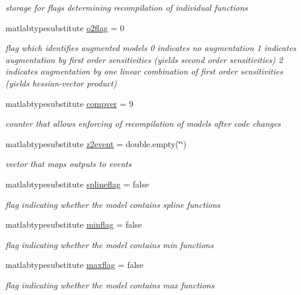 \begin{DoxyCompactItemize}
\begin{DoxyCompactList}\small\item\em storage for flags determining recompilation of individual functions \end{DoxyCompactList}\item 
matlabtypesubstitute \hyperlink{classamimodel_a2b89e3b4e249878a2d436ee337952c4f}{o2flag} = 0
\begin{DoxyCompactList}\small\item\em flag which identifies augmented models 0 indicates no augmentation 1 indicates augmentation by first order sensitivities (yields second order sensitivities) 2 indicates augmentation by one linear combination of first order sensitivities (yields hessian-\/vector product) \end{DoxyCompactList}\item 
matlabtypesubstitute \hyperlink{classamimodel_a0a9e4caf628a02e6db68e91c2de6f382}{compver} = 9
\begin{DoxyCompactList}\small\item\em counter that allows enforcing of recompilation of models after code changes \end{DoxyCompactList}\item 
matlabtypesubstitute \hyperlink{classamimodel_a7a7be015feeb7a346dceccd49e622b4b}{z2event} = double.\+empty(\char`\"{}\char`\"{})
\begin{DoxyCompactList}\small\item\em vector that maps outputs to events \end{DoxyCompactList}\item 
matlabtypesubstitute \hyperlink{classamimodel_abea45d67286ebbf35dcbc12e335ffd51}{splineflag} = false
\begin{DoxyCompactList}\small\item\em flag indicating whether the model contains spline functions \end{DoxyCompactList}\item 
matlabtypesubstitute \hyperlink{classamimodel_affead4b7a87bc135fea91fd5aada78a8}{minflag} = false
\begin{DoxyCompactList}\small\item\em flag indicating whether the model contains min functions \end{DoxyCompactList}\item 
matlabtypesubstitute \hyperlink{classamimodel_a1a65e7157ae2262cfa11a783b018364f}{maxflag} = false
\begin{DoxyCompactList}\small\item\em flag indicating whether the model contains max functions \end{DoxyCompactList}\item 

\end{DoxyCompactItemize}
